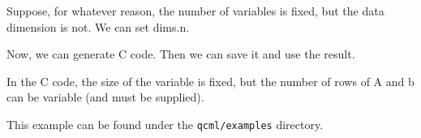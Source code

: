 \documentclass[11pt]{article}
\begin{document}
Suppose, for whatever reason, the number of variables is fixed, but the data
dimension is not. We can set dims.n.

Now, we can generate C code.
Then we can save it and use the result.

In the C code, the size of the variable is fixed, but the number of rows of A
and b can be variable (and must be supplied).

This example can be found under the {\tt qcml/examples} directory.

% 
% 
% 
% 
% 
% 
% 
% 
% 
% 
%   
% 
\end{document}
